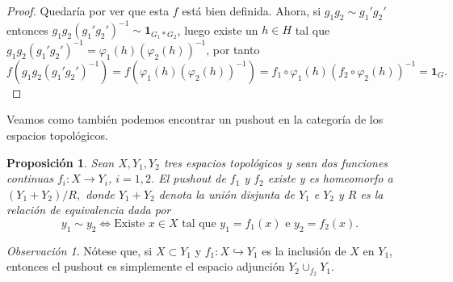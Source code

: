 \documentclass[12pt,a4paper]{book}
\newtheorem{prop}[thm]{Proposición}
\theoremstyle{definition} \newtheorem{defn}[thm]{Definición}
\theoremstyle{definition} \newtheorem{ejemplo}[thm]{Ejemplo}
\theoremstyle{definition} \newtheorem{ejercicio}[thm]{Ejercicio}
\theoremstyle{remark} \newtheorem*{obs}{Observación}
\begin{document}
\begin{proof}
    Quedaría por ver que esta $f$ está bien definida. Ahora, si $g_1g_2 \sim g_1'g_2'$ entonces $g_1g_2(g_1'g_2')^{-1}\sim \mathbf{1}_{G_1*G_2}$, luego existe un $h\in H$ tal que $g_1g_2(g_1'g_2')^{-1}=\varphi_1(h)(\varphi_2(h))^{-1}$, por tanto
    \begin{equation*}
      f(g_1g_2(g_1'g_2')^{-1})=f(\varphi_1(h)(\varphi_2(h))^{-1})=f_1\circ\varphi_1(h)(f_2\circ\varphi_2(h))^{-1}=\mathbf{1}_{G}.
    \end{equation*}
\end{proof}

  Veamos como también podemos encontrar un pushout en la categoría de los espacios topológicos.
\begin{prop}  
   Sean $X,Y_1,Y_2$ tres espacios topológicos y sean dos funciones continuas $f_i:X\rightarrow Y_i$, $i=1,2$. El pushout de $f_1$ y $f_2$ existe y es homeomorfo a $
    (Y_1+Y_2)/R,
  $
  donde $Y_1+Y_2$ denota la unión disjunta de $Y_1$ e $Y_2$ y $R$ es la relación de equivalencia dada por
  \begin{equation*}
    y_1 \sim y_2 \Leftrightarrow \text{Existe } x\in X \text{ tal que } y_1=f_1(x) \text{ e } y_2=f_2(x).
  \end{equation*}
  \end{prop}
  \begin{obs}
    Nótese que, si $X\subset Y_1$ y $f_1:X\hookrightarrow Y_1$ es la inclusión de $X$ en $Y_1$, entonces el pushout es simplemente el espacio adjunción
$
Y_2\cup_{f_2} Y_1.
  $
\end{obs}
\end{document}
